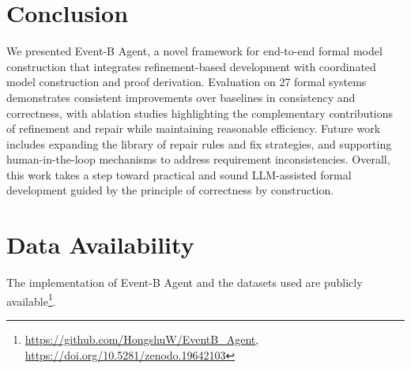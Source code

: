 \section{Conclusion}

We presented Event-B Agent, a novel framework for end-to-end formal model construction that integrates refinement-based development with coordinated model construction and proof derivation.
Evaluation on 27 formal systems demonstrates consistent improvements over baselines in consistency and correctness, with ablation studies highlighting the complementary contributions of refinement and repair while maintaining reasonable efficiency.
Future work includes expanding the library of repair rules and fix strategies, and supporting human-in-the-loop mechanisms to address requirement inconsistencies.
Overall, this work takes a step toward practical and sound LLM-assisted formal development guided by the principle of correctness by construction.


\section{Data Availability}
The implementation of Event-B Agent and the datasets used are publicly available\footnote{\url{https://github.com/HongshuW/EventB_Agent}, \url{https://doi.org/10.5281/zenodo.19642103}}.
